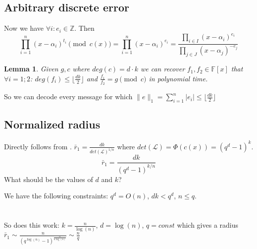 \documentclass[12pt]{article}
\newcommand{\floor}[1]{\lfloor #1 \rfloor}
\newtheorem{lemma}{Lemma}
\begin{document}
\subsection{Arbitrary discrete error}
Now we have $\forall i: e_i \in \mathbb{Z}$. Then
\[
\prod_{i = 1}^{n}(x - \alpha_i)^{t_i} \pmod{c(x)} = \prod_{i = 1}^{n}(x - \alpha_i)^{e_i} = \frac{\prod_{i \in I}(x - \alpha_i)^{e_i}}{\prod_{j \in J}(x - \alpha_j)^{-e_j}}
\]
\begin{lemma}
Given $g,c$ where $deg(c) = d \cdot k$ we can recover $f_{1}, f_{2} \in \mathbb{F}[x]$ that  $\forall i = 1;2$: $deg(f_{i}) \leq \floor{\frac{dk}{2}}$ and $\frac{f_{1}}{f_{2}} = g \pmod{c}$ in polynomial time.
\end{lemma}
So we can decode every message for which $\|e\|_1 = \sum_{i =1}^{n} |e_i| \leq \floor{\frac{dk}{2}}$

\subsection{Normalized radius}
Directly follows from \cite{[DP19]}. $\bar{r}_1 = \frac{dk}{det(\mathcal{L})^{1/n}}$ where $det(\mathcal{L}) = \Phi(c(x)) = (q^{d} - 1)^{k}$.
\[
\bar{r}_1 = \frac{dk}{(q^{d} - 1)^{k/n}}
\]
What should be the values of $d$ and $k$?

We have the following constraints: $q^d = O(n)$, $dk < q^{d}$, $n \leq q$. \\ \\ \\
So does this work: $k = \frac{n}{\log(n)}$, $d = \log(n)$, $q = const $ which gives a radius $\bar{r}_1 \sim \frac{n}{(q^{\log(n)}-1)^{\frac{n}{n \log(n)}}} \sim \frac{n}{q}$





\end{document}
